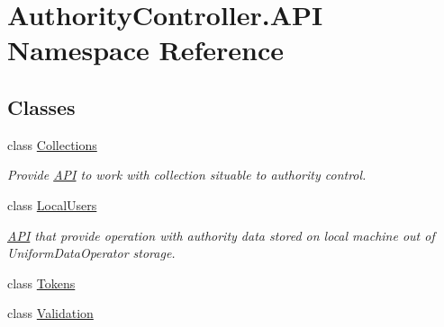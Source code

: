 \hypertarget{namespace_authority_controller_1_1_a_p_i}{}\section{Authority\+Controller.\+A\+PI Namespace Reference}
\label{namespace_authority_controller_1_1_a_p_i}
\subsection*{Classes}
\begin{DoxyCompactItemize}
\item 
class \mbox{\hyperlink{class_authority_controller_1_1_a_p_i_1_1_collections}{Collections}}
\begin{DoxyCompactList}\small\item\em Provide \mbox{\hyperlink{namespace_authority_controller_1_1_a_p_i}{A\+PI}} to work with collection situable to authority control. \end{DoxyCompactList}\item 
class \mbox{\hyperlink{class_authority_controller_1_1_a_p_i_1_1_local_users}{Local\+Users}}
\begin{DoxyCompactList}\small\item\em \mbox{\hyperlink{namespace_authority_controller_1_1_a_p_i}{A\+PI}} that provide operation with authority data stored on local machine out of Uniform\+Data\+Operator storage. \end{DoxyCompactList}\item 
class \mbox{\hyperlink{class_authority_controller_1_1_a_p_i_1_1_tokens}{Tokens}}
\item 
class \mbox{\hyperlink{class_authority_controller_1_1_a_p_i_1_1_validation}{Validation}}
\end{DoxyCompactItemize}
